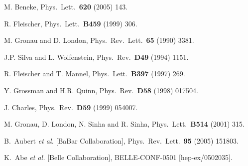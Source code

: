 \documentclass[12pt]{article}
\begin{document}
\begin{thebibliography}{999}
M. Beneke,
  { Phys.\ Lett.}~{\bf 620} (2005) 143.

R. Fleischer,
  { Phys.\ Lett.}~{\bf B459} (1999) 306.

M. Gronau and D. London,
{ Phys.\ Rev.\ Lett.}~{\bf 65} (1990) 3381.

J.P. Silva and L. Wolfenstein,
{ Phys.\ Rev.}~{\bf D49} (1994) 1151.

R. Fleischer and T. Mannel,
{ Phys.\ Lett.}~{\bf B397} (1997) 269.

Y. Grossman and H.R. Quinn,
{ Phys.\ Rev.}~{\bf D58} (1998) 017504.

J. Charles,
{ Phys.\ Rev.}~{\bf D59} (1999) 054007.

M. Gronau, D. London, N. Sinha and R. Sinha,
{ Phys.\ Lett.}~{\bf B514} (2001) 315.

B.~Aubert {\it et al.}  [BaBar Collaboration],
  { Phys.\ Rev.\ Lett.}~{\bf 95} (2005) 151803.

K.~Abe {\it et al.}  [Belle Collaboration],
 BELLE-CONF-0501  [hep-ex/0502035].


\end{thebibliography}
\end{document}
